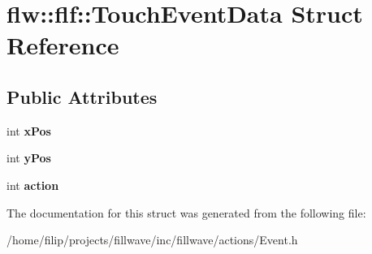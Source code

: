 \hypertarget{structflw_1_1flf_1_1TouchEventData}{}\section{flw\+:\+:flf\+:\+:Touch\+Event\+Data Struct Reference}
\label{structflw_1_1flf_1_1TouchEventData}
\subsection*{Public Attributes}
\begin{DoxyCompactItemize}
\item 
\mbox{\label{structflw_1_1flf_1_1TouchEventData_a358be6219f32e71f510144f4459cf2df}} 
int {\bfseries x\+Pos}
\item 
\mbox{\label{structflw_1_1flf_1_1TouchEventData_a002aac325e6c7fa0e247d0760b457ed1}} 
int {\bfseries y\+Pos}
\item 
\mbox{\label{structflw_1_1flf_1_1TouchEventData_a554f89c076f33304f762c2bae912d27d}} 
int {\bfseries action}
\end{DoxyCompactItemize}


The documentation for this struct was generated from the following file\+:\begin{DoxyCompactItemize}
\item 
/home/filip/projects/fillwave/inc/fillwave/actions/Event.\+h\end{DoxyCompactItemize}
